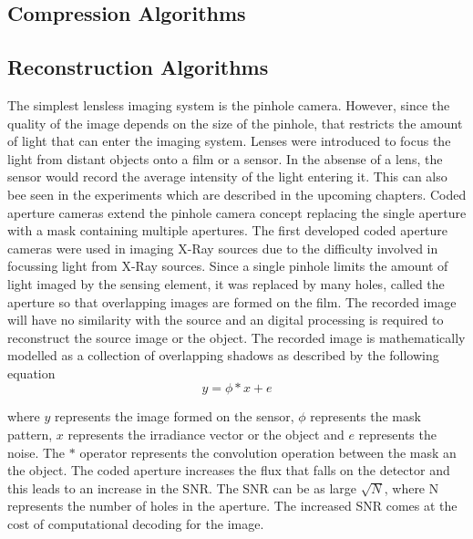 \subsection{Compression Algorithms}

\subsection{Reconstruction Algorithms}
The simplest lensless imaging system is the pinhole camera. However, since the quality of the image depends on the size of the pinhole, that restricts the amount of light that can enter the imaging system. Lenses were introduced to focus the light from distant objects onto a film or a sensor. In the absense of a lens, the sensor would record the average intensity of the light entering it. This can also bee seen in the experiments which are described in the upcoming chapters. Coded aperture cameras extend the pinhole camera concept replacing the single aperture with a mask containing multiple apertures. The first developed coded aperture cameras were used in imaging X-Ray sources due to the difficulty involved in focussing light from X-Ray sources\cite{Cannon1}. Since a single pinhole limits the amount of light imaged by the sensing element, it was replaced by many holes, called the aperture so that overlapping images are formed on the film. The recorded image will have no similarity with the source and an digital processing is required to reconstruct the source image or the object. The recorded image is mathematically modelled as a  collection of overlapping shadows as described by the following equation\cite{VBoomi}\cite{Cannon1} 
\begin{equation}
y = \phi * x + e
\end{equation}

where $y$ represents the image formed on the sensor, $\phi$ represents the mask pattern, $x$ represents the irradiance vector or the object and $e$ represents the noise. The $*$ operator represents the convolution operation between the mask an the object. The coded aperture increases the flux that falls on the detector and this leads to an increase in the SNR. The SNR can be as large $\sqrt{N}$, where N represents the number of holes in the aperture\cite{Cannon1}. The increased SNR comes at the cost of computational decoding for the image. 